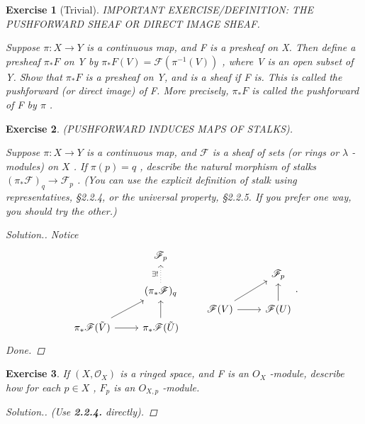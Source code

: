 \documentclass{article}
\theoremstyle{breakstyle}
\newtheorem{exercise}{Exercise}[section]
\newenvironment{solution}
  {\begin{proof}[Solution.]\renewcommand{\qedsymbol}{}}
  {\end{proof}}
\begin{document}
\begin{exercise}[Trivial]
IMPORTANT EXERCISE/DEFINITION: THE PUSHFORWARD SHEAF OR DIRECT IMAGE SHEAF.

Suppose $\pi\colon X \to Y$ is a continuous map, and F is a presheaf on X. Then
define a presheaf $\pi_{*}F$ on Y by $\pi_{*}F(V) = \mathcal{F}(\pi^{-1}(V))$ ,
where V is an open subset of Y. Show that $\pi_{*}F$ is a presheaf on Y, and is
a sheaf if F is. This is called the pushforward (or direct image) of F. More
precisely, $\pi_{*}F$ is called the pushforward of F by $\pi$ .
\end{exercise}

\begin{exercise}
(PUSHFORWARD INDUCES MAPS OF STALKS).

Suppose $\pi: X \to Y$ is a continuous map, and $\mathcal{F}$ is a sheaf of sets
(or rings or $\lambda$ -modules) on $X$ . If $\pi(p) = q$ , describe the natural
morphism of stalks $(\pi_*\mathcal{F})_q \to \mathcal{F}_p$ . (You can use the
explicit definition of stalk using representatives, §2.2.4, or the universal
property, §2.2.5. If you prefer one way, you should try the other.)

\begin{solution}
    Notice
    $$
    \begin{tikzcd}
                                                       & \mathscr{F}_{p}                                        \\
                                                       & (\pi_{*}\mathscr{F})_{q} \arrow[u, "\exists!", dotted] \\
    \pi_{*}\mathscr{F}(\tilde{V}) \arrow[ru] \arrow[r] & \pi_{*}\mathscr{F}(\tilde{U}) \arrow[u]               
    \end{tikzcd}
    \qquad
    \begin{tikzcd}
                                        & \mathscr{F}_{p}          \\
    \mathscr{F}(V) \arrow[r] \arrow[ru] & \mathscr{F}(U) \arrow[u]
    \end{tikzcd}
    .$$
    Done.
\end{solution}

\end{exercise}

\begin{exercise}
If $(X, \mathcal{O}_{X})$ is a ringed space, and F is an $O_{X}$ -module,
describe how for each $p \in X$ , $F_{p}$ is an $O_{X,p}$ -module.

\begin{solution}
    \emph{(Use \textbf{2.2.4.} directly)}.
\end{solution}

\end{exercise}
\end{document}
